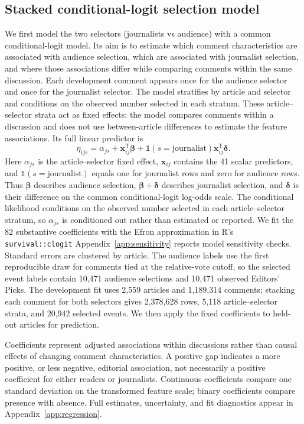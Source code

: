 \subsection{Stacked conditional-logit selection model}
We first model the two selectors (journalists vs audience) with a common conditional-logit model. Its aim is to estimate which comment characteristics are associated with audience selection, which are associated with journalist selection, and where those associations differ while comparing comments within the same discussion. Each development comment appears once for the audience selector and once for the journalist selector. The model stratifies by article and selector and conditions on the observed number selected in each stratum. These article--selector strata act as fixed effects: the model compares comments within a discussion and does not use between-article differences to estimate the feature associations. Its full linear predictor is
\begin{equation}
\eta_{ijs}=\alpha_{js}
+\boldsymbol{x}_{ij}^{\mathsf T}\boldsymbol{\beta}
+\mathbb{1}(s=\mathrm{journalist})\boldsymbol{x}_{ij}^{\mathsf T}\boldsymbol{\delta}.
\end{equation}
Here $\alpha_{js}$ is the article--selector fixed effect, $\boldsymbol{x}_{ij}$ contains the 41 scalar predictors, and $\mathbb{1}(s=\mathrm{journalist})$ equals one for journalist rows and zero for audience rows. Thus $\boldsymbol{\beta}$ describes audience selection, $\boldsymbol{\beta}+\boldsymbol{\delta}$ describes journalist selection, and $\boldsymbol{\delta}$ is their difference on the common conditional-logit log-odds scale. The conditional likelihood conditions on the observed number selected in each article--selector stratum, so $\alpha_{js}$ is conditioned out rather than estimated or reported. We fit the 82 substantive coefficients with the Efron approximation in R's \texttt{survival::clogit} \citep{survival-Therneau2024survival} Appendix~\ref{app:sensitivity} reports model sensitivity checks. Standard errors are clustered by article. The audience labels use the first reproducible draw for comments tied at the relative-vote cutoff, so the selected event labels contain 10,471 audience selections and 10,471 observed Editors' Picks. The development fit uses 2,559 articles and 1,189,314 comments; stacking each comment for both selectors gives 2,378,628 rows, 5,118 article--selector strata, and 20,942 selected events. We then apply the fixed coefficients to held-out articles for prediction.

Coefficients represent adjusted associations within discussions rather than causal effects of changing comment characteristics. A positive gap indicates a more positive, or less negative, editorial association, not necessarily a positive coefficient for either readers or journalists. Continuous coefficients compare one standard deviation on the transformed feature scale; binary coefficients compare presence with absence. Full estimates, uncertainty, and fit diagnostics appear in Appendix~\ref{app:regression}.

